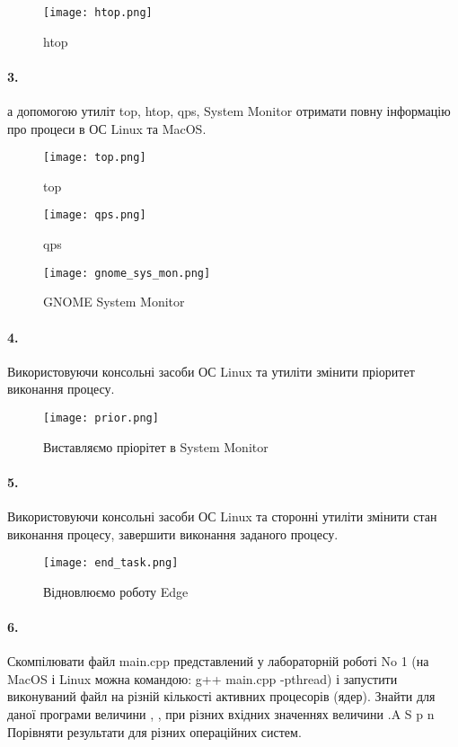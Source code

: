 \documentclass[12pt]{extarticle}
\begin{document}
\begin{figure}[H]
    \centering
    \texttt{[image: htop.png]}
    \caption{htop}
\end{figure}

\paragraph{3.}
а допомогою утиліт top, htop, qps, System Monitor отримати повну
інформацію про процеси в ОС Linux та MacOS.

\begin{figure}[H]
    \centering
    \texttt{[image: top.png]}
    \caption{top}
\end{figure}
\begin{figure}[H]
    \centering
    \texttt{[image: qps.png]}
    \caption{qps}
\end{figure}
\begin{figure}[H]
    \centering
    \texttt{[image: gnome\_sys\_mon.png]}
    \caption{GNOME System Monitor}
\end{figure}

\paragraph{4.}
Використовуючи консольні засоби ОС Linux та утиліти змінити
пріоритет виконання процесу.
\begin{figure}[H]
    \centering
    \texttt{[image: prior.png]}
    \caption{Виставляємо пріорітет в System Monitor}
\end{figure}

\break
\paragraph{5.}
Використовуючи консольні засоби ОС Linux та сторонні утиліти
змінити стан виконання процесу, завершити виконання заданого процесу.

\begin{figure}[H]
    \centering
    \texttt{[image: end\_task.png]}
    \caption{Відновлюємо роботу Edge}
\end{figure}

\vspace{12pt}

\paragraph{6.}
Скомпілювати файл main.cpp представлений у лабораторній роботі No 1
(на MacOS і Linux можна командою: g++ main.cpp -pthread) і запустити
виконуваний файл на різній кількості активних процесорів (ядер). Знайти для
даної програми величини , , при різних вхідних значеннях величини .A S p n
Порівняти результати для різних операційних систем.
\end{document}
